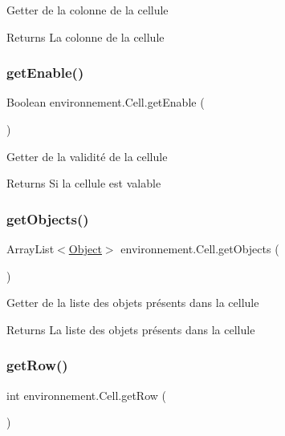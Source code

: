 Getter de la colonne de la cellule \begin{DoxyReturn}{Returns}
La colonne de la cellule 
\end{DoxyReturn}
\hypertarget{classenvironnement_1_1_cell_a25650d3cbb77512f24039d6ac9d454ba}{}\label{classenvironnement_1_1_cell_a25650d3cbb77512f24039d6ac9d454ba} 
\subsubsection{\texorpdfstring{get\+Enable()}{getEnable()}}
{\footnotesize\ttfamily Boolean environnement.\+Cell.\+get\+Enable (\begin{DoxyParamCaption}{ }\end{DoxyParamCaption})}

Getter de la validité de la cellule \begin{DoxyReturn}{Returns}
Si la cellule est valable 
\end{DoxyReturn}
\hypertarget{classenvironnement_1_1_cell_a2423a51a5e48790cea89061c3793357a}{}\label{classenvironnement_1_1_cell_a2423a51a5e48790cea89061c3793357a} 
\subsubsection{\texorpdfstring{get\+Objects()}{getObjects()}}
{\footnotesize\ttfamily Array\+List$<$\hyperlink{classenvironnement_1_1_object}{Object}$>$ environnement.\+Cell.\+get\+Objects (\begin{DoxyParamCaption}{ }\end{DoxyParamCaption})}

Getter de la liste des objets présents dans la cellule \begin{DoxyReturn}{Returns}
La liste des objets présents dans la cellule 
\end{DoxyReturn}
\hypertarget{classenvironnement_1_1_cell_a614f23d343407efa4f07156f414522db}{}\label{classenvironnement_1_1_cell_a614f23d343407efa4f07156f414522db} 
\subsubsection{\texorpdfstring{get\+Row()}{getRow()}}
{\footnotesize\ttfamily int environnement.\+Cell.\+get\+Row (\begin{DoxyParamCaption}{ }\end{DoxyParamCaption})}

